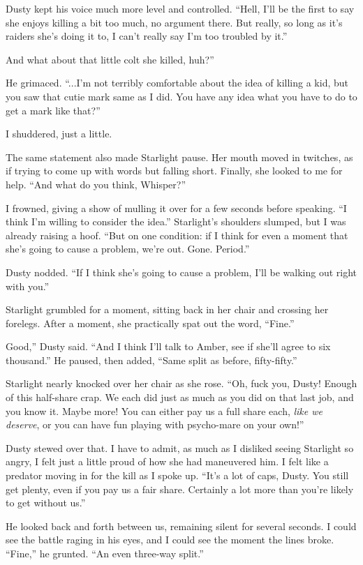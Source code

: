 Dusty kept his voice much more level and controlled. “Hell, I’ll be the first to say she enjoys killing a bit too much, no argument there. But really, so long as it’s raiders she’s doing it to, I can’t really say I’m too troubled by it.”

\leavevmode{}And what about that little colt she killed, huh?”

He grimaced. “...I’m not terribly comfortable about the idea of killing a kid, but you saw that cutie mark same as I did. You have any idea what you have to do to get a mark like that?”

I shuddered, just a little.

The same statement also made Starlight pause. Her mouth moved in twitches, as if trying to come up with words but falling short. Finally, she looked to me for help. “And what do you think, Whisper?”

I frowned, giving a show of mulling it over for a few seconds before speaking. “I think I’m willing to consider the idea.” Starlight’s shoulders slumped, but I was already raising a hoof. “But on one condition: if I think for even a moment that she’s going to cause a problem, we’re out. Gone. Period.”

Dusty nodded. “If I think she’s going to cause a problem, I’ll be walking out right with you.”

Starlight grumbled for a moment, sitting back in her chair and crossing her forelegs. After a moment, she practically spat out the word, “Fine.”

\leavevmode{}Good,” Dusty said. “And I think I’ll talk to Amber, see if she’ll agree to six thousand.” He paused, then added, “Same split as before, fifty-fifty.”

Starlight nearly knocked over her chair as she rose. “Oh, fuck you, Dusty! Enough of this half-share crap. We each did just as much as you did on that last job, and you know it. Maybe more! You can either pay us a full share each, \textit{like we deserve}, or you can have fun playing with psycho-mare on your own!”

Dusty stewed over that. I have to admit, as much as I disliked seeing Starlight so angry, I felt just a little proud of how she had maneuvered him. I felt like a predator moving in for the kill as I spoke up. “It’s a lot of caps, Dusty. You still get plenty, even if you pay us a fair share. Certainly a lot more than you’re likely to get without us.”

He looked back and forth between us, remaining silent for several seconds. I could see the battle raging in his eyes, and I could see the moment the lines broke. “Fine,” he grunted. “An even three-way split.”

